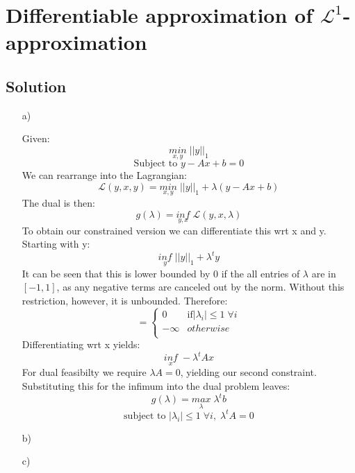 \documentclass[10pt]{article}
\numberwithin{equation}{section}
\begin{document}
\section*{Differentiable approximation of $\mathcal{L}^1$-approximation}
\subsection*{Solution}

\begin{enumerate}
\item[a)]{
    Given:
    $$\underset{x,y}{min}\; ||y||_1$$
    $$\text{Subject to } y-Ax + b = 0$$
    We can rearrange into the Lagrangian:
    $$\mathcal{L}(y,x,y) = \underset{x,y}{min}\; ||y||_1 + \lambda (y-Ax+b)$$
    The dual is then:
    $$g(\lambda) = \underset{y,x}{inf}\; \mathcal{L}(y,x,\lambda)$$
    To obtain our constrained version we can differentiate this wrt x and y.
    Starting with y:
    $$\underset{y}{inf}\; ||y||_1 + \lambda^t y$$
    It can be seen that this is lower bounded by 0 if the all entries of $\lambda$ are in $[-1,1]$, as any negative terms are canceled out by the norm. Without this restriction, however, it is unbounded. Therefore:
    $$ = \begin{cases}
      0 & \text{if} |\lambda_i| \leq 1\; \forall i\\
      -\infty & otherwise\\
    \end{cases}$$
    Differentiating wrt x yields:
    $$\underset{x}{inf}\; -\lambda^t Ax$$
    For dual feasibilty we require $\lambda A = 0$, yielding our second constraint.
    Substituting this for the infimum into the dual problem leaves:
    $$g(\lambda) = \underset{\lambda}{max}\; \lambda^t b$$
    $$\text{subject to } |\lambda_i| \leq 1\; \forall i,\; \lambda^t A =0$$

}
\item[b)]{

}
\item[c)]{

}
\end{enumerate}
\end{document}
